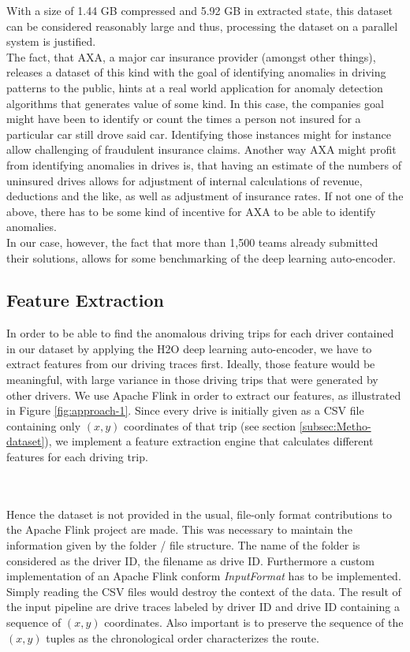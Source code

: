 \documentclass{vldb}
\begin{document}
With a size of 1.44 GB compressed and 5.92 GB in extracted state, this dataset can be considered reasonably large and thus, processing the dataset on a parallel system is justified. \\
The fact, that AXA, a major car insurance provider (amongst other things), releases a dataset of this kind with the goal of identifying anomalies in driving patterns to the public, hints at a real world application for anomaly detection algorithms that generates value of some kind. In this case, the companies goal might have been to identify or count the times a person not insured for a particular car still drove said car. Identifying those instances might for instance allow challenging of fraudulent insurance claims. Another way AXA might profit from identifying anomalies in drives is, that having an estimate of the numbers of uninsured drives allows for adjustment of internal calculations of revenue, deductions and the like, as well as adjustment of insurance rates. If not one of the above, there has to be some kind of incentive for AXA to be able to identify anomalies. \\
In our case, however, the fact that more than 1,500 teams already submitted their solutions, allows for some benchmarking of the deep learning auto-encoder.

\subsection{Feature Extraction}
\label{subsec:Metho-feature}
In order to be able to find the anomalous driving trips for each driver contained in our dataset by applying the H2O deep learning auto-encoder, we have to extract features from our driving traces first. Ideally, those feature would be meaningful, with large variance in those driving trips that were generated by other drivers. We use Apache Flink in order to extract our features, as illustrated in Figure \ref{fig:approach-1}. Since every drive is initially given as a CSV file containing only $(x, y)$ coordinates of that trip (see section \ref{subsec:Metho-dataset}), we implement a feature extraction engine that calculates different features for each driving trip.\\\\\

Hence the dataset is not provided in the usual, file-only format contributions to the Apache Flink project are made. This was necessary to maintain the information given by the folder / file structure. The name of the folder is considered as the driver ID, the filename as drive ID. Furthermore a custom implementation of an Apache Flink conform \textit{InputFormat} has to be implemented. Simply reading the CSV files would destroy the context of the data. The result of the input pipeline are drive traces labeled by driver ID and drive ID containing a sequence of $(x, y)$ coordinates. Also important is to preserve the sequence of the $(x, y)$ tuples as the chronological order characterizes the route.\\\\
\end{document}
